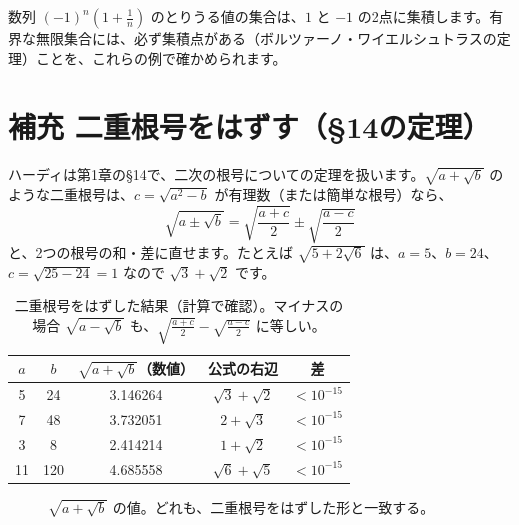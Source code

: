 \documentclass[a4paper,11pt,openany]{ltjsbook}
\begin{document}
数列 $(-1)^n\left(1+\frac1n\right)$ のとりうる値の集合は、$1$ と $-1$ の2点に集積します。有界な無限集合には、必ず集積点がある（ボルツァーノ・ワイエルシュトラスの定理）ことを、これらの例で確かめられます。

\section{補充 二重根号をはずす（§14の定理）}

ハーディは第1章の§14で、二次の根号についての定理を扱います。$\sqrt{a+\sqrt b}$ のような二重根号は、$c=\sqrt{a^2-b}$ が有理数（または簡単な根号）なら、
\[
\sqrt{a\pm\sqrt b}=\sqrt{\frac{a+c}2}\pm\sqrt{\frac{a-c}2}
\]
と、2つの根号の和・差に直せます。たとえば $\sqrt{5+2\sqrt6}$ は、$a=5$、$b=24$、$c=\sqrt{25-24}=1$ なので $\sqrt3+\sqrt2$ です。

\begin{table}[htbp]
\centering
\begin{tabular}{cc|cc|c}
\toprule
$a$ & $b$ & $\sqrt{a+\sqrt b}$（数値） & 公式の右辺 & 差\\
\midrule
5 & 24 & 3.146264 & $\sqrt3+\sqrt2$ & $<10^{-15}$\\
7 & 48 & 3.732051 & $2+\sqrt3$ & $<10^{-15}$\\
3 & 8 & 2.414214 & $1+\sqrt2$ & $<10^{-15}$\\
11 & 120 & 4.685558 & $\sqrt6+\sqrt5$ & $<10^{-15}$\\
\bottomrule
\end{tabular}
\caption{二重根号をはずした結果（計算で確認）。マイナスの場合 $\sqrt{a-\sqrt b}$ も、$\sqrt{\tfrac{a+c}2}-\sqrt{\tfrac{a-c}2}$ に等しい。}
\end{table}

\begin{figure}[htbp]
\centering
{}
\caption{$\sqrt{a+\sqrt b}$ の値。どれも、二重根号をはずした形と一致する。}
\end{figure}
\end{document}
